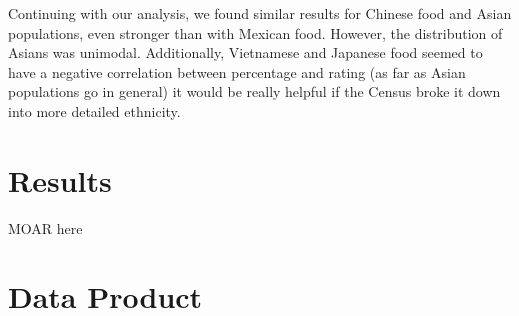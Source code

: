\documentclass[11pt,twocolumn]{article}
\begin{document}
Continuing with our analysis, we found similar results for Chinese food and Asian populations, even stronger than with Mexican food. However, the distribution of Asians was unimodal. Additionally, Vietnamese and Japanese food seemed to have a negative correlation between percentage and rating (as far as Asian populations go in general) it would be really helpful if the Census broke it down into more detailed ethnicity.

\section{Results}
MOAR here


\section{Data Product}
\end{document}
